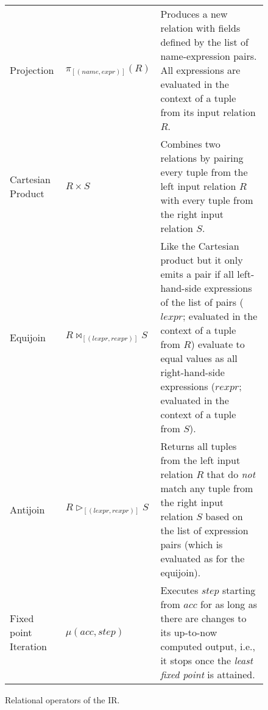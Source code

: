 \begin{figure}[htpb]
\begin{tabular}{@{}p{}p{}p{}@{}}
		Projection         & \(\pi_{[(\mathit{name},\mathit{expr})]}(R)\)                & Produces a new relation with fields defined by the list of name-expression pairs. All expressions are evaluated in the context of a tuple from its input relation \(R\).                                                                                                                                          \\
		Cartesian Product  & \(R \times S\)                                              & Combines two relations by pairing every tuple from the left input relation \(R\) with every tuple from the right input relation \(S\).                                                                                                                                                                            \\
		Equijoin           & \(R \bowtie_{[(\mathit{lexpr}, \mathit{rexpr})]} S\)        & Like the Cartesian product but it only emits a pair if all left-hand-side expressions of the list of pairs (\(\mathit{lexpr}\); evaluated in the context of a tuple from \(R\)) evaluate to equal values as all right-hand-side expressions (\(\mathit{rexpr}\); evaluated in the context of a tuple from \(S\)). \\
		Antijoin           & \(R \triangleright_{[(\mathit{lexpr}, \mathit{rexpr})]} S\) & Returns all tuples from the left input relation \(R\) that do \emph{not} match any tuple from the right input relation \(S\) based on the list of expression pairs (which is evaluated as for the equijoin).                                                                                                      \\
		Fixed point Iteration & \(\mu(\mathit{acc}, \mathit{step})\)                        & Executes \(\mathit{step}\) starting from \(\mathit{acc}\) for as long as there are changes to its up-to-now computed output, i.e., it stops once the \emph{least fixed point} is attained.                                                                                                                           \\
		\bottomrule
	\end{tabular}
	\caption{Relational operators of the \ac{IR}.}\label{tab:ir-operators}
\end{figure}

